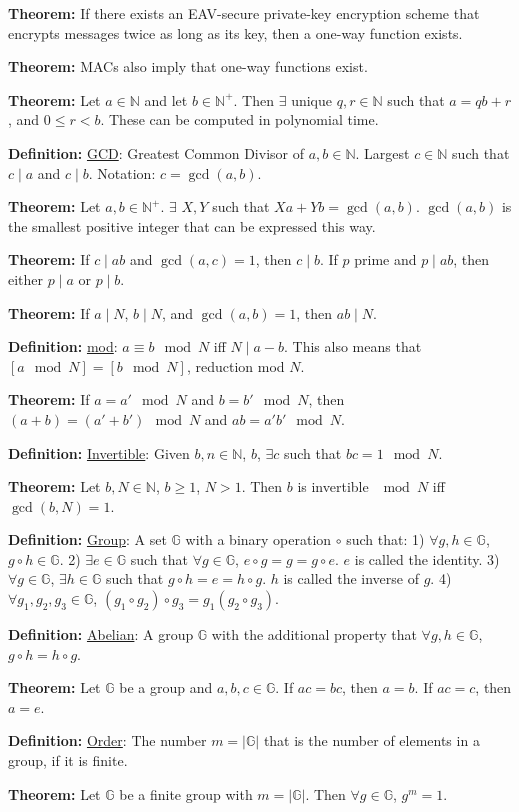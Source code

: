\documentclass[10pt]{article}
\newcommand{\N}{\mathbb{N}}
\newcommand{\G}{\mathbb{G}}
\newcommand{\defn}[1]{{\bf Definition:} \underline{#1}}
\newcommand{\thm}[1]{{\bf Theorem:} \underline{#1}}
\begin{document}
\begin{multicols}{3}
\thm{}If there exists an EAV-secure private-key encryption scheme that encrypts messages twice as long as its key, then a one-way function exists.

\thm{}MACs also imply that one-way functions exist.

\thm{}Let $a\in\N$ and let $b\in\N^+$. Then $\exists$ unique $q,r\in\N$ such that $a=qb+r$, and $0\leq r<b$. These can be computed in polynomial time.

\defn{GCD}: Greatest Common Divisor of $a,b\in\N$. Largest $c\in\N$ such that $c\mid a$ and $c\mid b$. Notation: $c=\gcd(a,b)$.

\thm{}Let $a,b\in\N^+$. $\exists$ $X,Y$ such that $Xa+Yb=\gcd(a,b)$. $\gcd(a,b)$ is the smallest positive integer that can be expressed this way.

\thm{}If $c\mid ab$ and $\gcd(a,c)=1$, then $c\mid b$. If $p$ prime and $p\mid ab$, then either $p\mid a$ or $p\mid b$.

\thm{}If $a\mid N$, $b\mid N$, and $\gcd(a,b)=1$, then $ab\mid N$.

\defn{mod}: $a\equiv b\mod{N}$ iff $N\mid{a-b}$. This also means that $[a\mod{N}]=[b\mod{N}]$, reduction mod $N$.

\thm{}If $a=a'\mod{N}$ and $b=b'\mod{N}$, then $(a+b)=(a'+b')\mod{N}$ and $ab=a'b'\mod{N}$.

\defn{Invertible}: Given $b,n\in\N$, $b$, $\exists c$ such that $bc=1\mod{N}$.

\thm{}Let $b,N\in\N$, $b\geq1$, $N>1$. Then $b$ is invertible $\mod{N}$ iff $\gcd(b,N)=1$.

\defn{Group}: A set $\G$ with a binary operation $\circ$ such that: 1) $\forall g,h\in\G$, $g\circ h\in\G$. 2) $\exists e\in\G$ such that $\forall g\in\G$, $e\circ g=g=g\circ e$. $e$ is called the identity. 3) $\forall g\in\G$, $\exists h\in\G$ such that $g\circ h=e=h\circ g$. $h$ is called the inverse of $g$. 4) $\forall g_1,g_2,g_3\in\G$, $(g_1\circ g_2)\circ g_3=g_1(g_2\circ g_3)$.

\defn{Abelian}: A group $\G$ with the additional property that $\forall g,h\in\G$, $g\circ h=h\circ g$.

\thm{}Let $\G$ be a group and $a,b,c\in\G$. If $ac=bc$, then $a=b$. If $ac=c$, then $a=e$.

\defn{Order}: The number $m=|\G|$ that is the number of elements in a group, if it is finite.

\thm{}Let $\G$ be a finite group with $m=|\G|$. Then $\forall g\in\G$, $g^m=1$.


\end{multicols}
\end{document}
